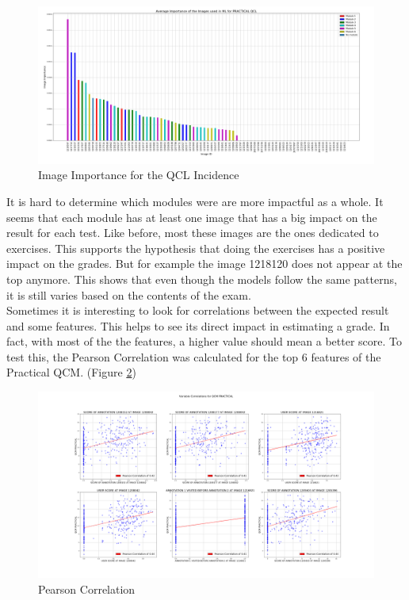 \documentclass[a4paper,11pt]{report}
\numberwithin{figure}{section} %
\begin{document}
      \begin{figure}[H]
      \centering
      \includegraphics[width=.95\linewidth]{plots/im_importance_PRACTICAL_QCL_2018-04-29_14_33_48.png}
      \caption{Image Importance for the QCL Incidence}
      \label{fig:im_tp4}
      \end{figure}

	It is hard to determine which modules were are more impactful as a whole.
    It seems that each module has at least one image that has a big impact on the result for each test.
	Like before, most these images are the ones dedicated to exercises.
	This supports the hypothesis that doing the exercises has a positive impact on the grades.
	But for example the image 1218120 does not appear at the top anymore.
	This shows that even though the models follow the same patterns, it is still varies based on the contents of the exam.\\

    Sometimes it is interesting  to look for correlations between the expected result and some features.
    This helps to see its direct impact in estimating a grade.
    In fact, with most of the the features, a higher value should mean a better score.
    To test this, the Pearson Correlation was calculated for the top 6 features of the Practical QCM. (Figure \ref{fig:corr_tp})
      \begin{figure}[H]
      \centering
      \includegraphics[width=.95\linewidth]{plots/var_correlation_QCM_PRACTICAL_2018-04-29_14_38_14.png}
      \caption{Pearson Correlation}
      \label{fig:corr_tp}
      \end{figure}
\end{document}
